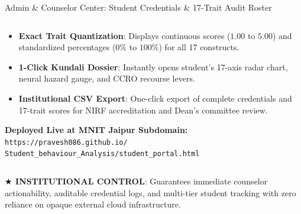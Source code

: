 \documentclass{beamer}
\begin{document}
\begin{frame}[t]{Admin \& Counselor Center: Student Credentials \& 17-Trait Audit Roster}
\begin{columns}[T]
    \begin{column}{0.44\textwidth}
      \begin{tcolorbox}[colback=white, colframe=BluePrimary, arc=1.2mm, boxrule=0.8pt, top=0.5mm, bottom=0.5mm, left=0.8mm, right=0.8mm, title={\scriptsize\bfseries\color{white}17-Trait Valuation \& Export Pipeline}, colbacktitle=BluePrimary]
        \fontsize{4.6pt}{5.6pt}\selectfont
        \begin{itemize}\setlength{\itemsep}{2pt}
          \item \textbf{Exact Trait Quantization}: Displays continuous scores ($1.00$ to $5.00$) and standardized percentages ($0\%$ to $100\%$) for all 17 constructs.
          \item \textbf{1-Click Kundali Dossier}: Instantly opens student's 17-axis radar chart, neural hazard gauge, and CCRO recourse levers.
          \item \textbf{Institutional CSV Export}: One-click export of complete credentials and 17-trait scores for NIRF accreditation and Dean's committee review.
        \end{itemize}
        \vspace{1.5mm}
        \centering
        \colorbox{BlueLight}{\parbox{0.92\linewidth}{
          \centering\fontsize{4.5pt}{5.5pt}\selectfont
          \textbf{Deployed Live at MNIT Jaipur Subdomain:}\\
          \color{BlueDeep}\texttt{https://pravesh086.github.io/}\\
          \texttt{Student\_behaviour\_Analysis/student\_portal.html}
        }}
      \end{tcolorbox}
    \end{column}
  \end{columns}
  \vspace{0.8mm}

  \begin{takeawaybanner}
    \fontsize{4.8pt}{5.8pt}\selectfont
    \textbf{\color{GoldPill}$\bigstar$ INSTITUTIONAL CONTROL}: Guarantees immediate counselor actionability, auditable credential logs, and multi-tier student tracking with zero reliance on opaque external cloud infrastructure.
  \end{takeawaybanner}
\end{frame}
\end{document}
